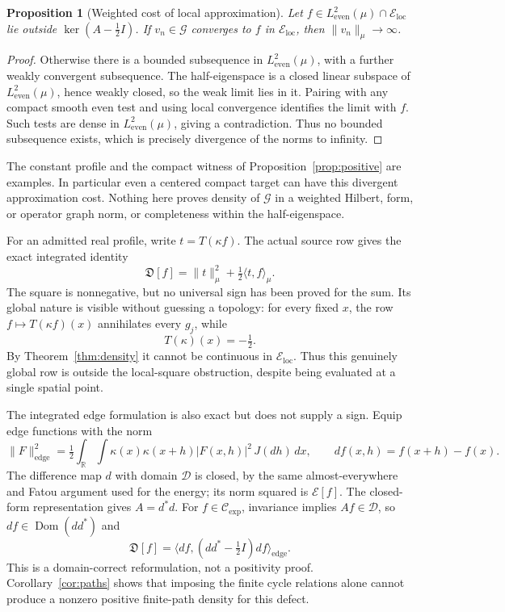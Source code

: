\documentclass[11pt,a4paper]{article}
\numberwithin{equation}{section}
\newtheorem{proposition}[theorem]{Proposition}
\theoremstyle{definition}
\theoremstyle{remark}
\newcommand{\R}{\mathbb R}
\newcommand{\E}{\mathcal E}
\newcommand{\D}{\mathcal D}
\newcommand{\He}{L^2_{\mathrm{even}}(\mu)}
\newcommand{\dom}{\operatorname{Dom}}
\newcommand{\ip}[2]{\langle #1,#2\rangle}
\newcommand{\norm}[1]{\lVert #1\rVert}
\newcommand{\CE}{\mathcal C_{\exp}}
\newcommand{\Eloc}{\mathcal E_{\mathrm{loc}}}
\newcommand{\Def}{\mathfrak D}
\begin{document}
\begin{proposition}[Weighted cost of local approximation]\label{prop:blowup}
Let $f\in\He\cap\Eloc$ lie outside $\ker(A-\tfrac12I)$. If $v_n\in\mathcal G$ converges to $f$ in $\Eloc$, then $\norm{v_n}_\mu\to\infty$.
\end{proposition}
\begin{proof}
Otherwise there is a bounded subsequence in $\He$, with a further weakly convergent subsequence. The half-eigenspace is a closed linear subspace of $\He$, hence weakly closed, so the weak limit lies in it. Pairing with any compact smooth even test and using local convergence identifies the limit with $f$. Such tests are dense in $\He$, giving a contradiction. Thus no bounded subsequence exists, which is precisely divergence of the norms to infinity.
\end{proof}

The constant profile and the compact witness of Proposition~\ref{prop:positive} are examples. In particular even a centered compact target can have this divergent approximation cost. Nothing here proves density of $\mathcal G$ in a weighted Hilbert, form, or operator graph norm, or completeness within the half-eigenspace.

For an admitted real profile, write $t=T(\kappa f)$. The actual source row gives the exact integrated identity
\begin{equation}\label{eq:signedsource-defect}
 \Def[f]=\norm t_\mu^2+\tfrac12\ip t f_\mu.
\end{equation}
The square is nonnegative, but no universal sign has been proved for the sum. Its global nature is visible without guessing a topology: for every fixed $x$, the row $f\mapsto T(\kappa f)(x)$ annihilates every $g_j$, while
\[
 T(\kappa)(x)=-\tfrac12.
\]
By Theorem~\ref{thm:density} it cannot be continuous in $\Eloc$. Thus this genuinely global row is outside the local-square obstruction, despite being evaluated at a single spatial point.

The integrated edge formulation is also exact but does not supply a sign. Equip edge functions with the norm
\[
 \norm F_{\mathrm{edge}}^2=\tfrac12\int_\R\int
     \kappa(x)\kappa(x+h)|F(x,h)|^2\,J(dh)\,dx,
 \qquad df(x,h)=f(x+h)-f(x).
\]
The difference map $d$ with domain $\D$ is closed, by the same almost-everywhere and Fatou argument used for the energy; its norm squared is $\E[f]$. The closed-form representation gives $A=d^*d$. For $f\in\CE$, invariance implies $Af\in\D$, so $df\in\dom(dd^*)$ and
\begin{equation}\label{eq:edge-defect}
 \Def[f]=\ip{df}{(dd^*-\tfrac12I)df}_{\mathrm{edge}}.
\end{equation}
This is a domain-correct reformulation, not a positivity proof. Corollary~\ref{cor:paths} shows that imposing the finite cycle relations alone cannot produce a nonzero positive finite-path density for this defect.
\end{document}
